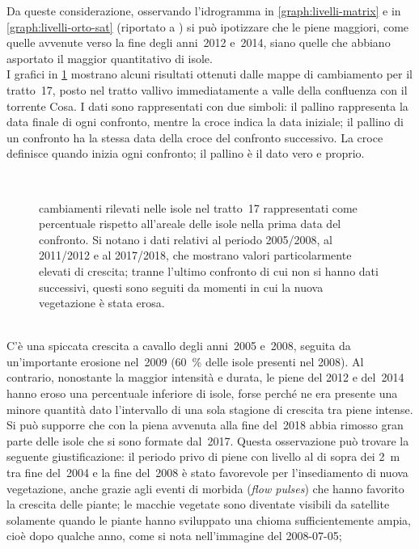 Da queste considerazione, osservando l'idrogramma in \cref{graph:livelli-matrix} e in \cref{graph:livelli-orto-sat} (riportato a ) si può ipotizzare che le piene maggiori, come quelle avvenute verso la fine degli anni~2012 e~2014, siano quelle che abbiano asportato il maggior quantitativo di isole.
\\
I grafici in \cref{graph:tr-17-camb} mostrano alcuni risultati ottenuti dalle mappe di cambiamento per il tratto~17, posto nel tratto vallivo immediatamente a valle della confluenza con il torrente Cosa.
I dati sono rappresentati con due simboli: il pallino rappresenta la data finale di ogni confronto, mentre la croce indica la data iniziale; il pallino di un confronto ha la stessa data della croce del confronto successivo. 
La croce definisce quando inizia ogni confronto; il pallino è il dato vero e proprio.
%
\begin{figure}
	\centering
	
	\\
	
	\caption[cambiamenti esperiti dalle isole nel tratto~17]{cambiamenti rilevati nelle isole nel tratto~17 rappresentati come percentuale rispetto all'areale delle isole nella prima data del confronto. 
	Si notano i dati relativi al periodo 2005/2008, al 2011/2012 e al 2017/2018, che mostrano valori particolarmente elevati di crescita; tranne l'ultimo confronto di cui non si hanno dati successivi, questi sono seguiti da momenti in cui la nuova vegetazione è stata erosa.}
	\label{graph:tr-17-camb}
\end{figure}
%
\\
C'è una spiccata crescita a cavallo degli anni~2005 e~2008, seguita da un'importante erosione nel~2009 (\SI{60}{\percent} delle isole presenti nel 2008).
Al contrario, nonostante la maggior intensità e durata, le piene del 2012 e del~2014 hanno eroso una percentuale inferiore di isole, forse perché ne era presente una minore quantità dato l'intervallo di una sola stagione di crescita tra piene intense.
\\
Si può supporre che con la piena avvenuta alla fine del~2018 abbia rimosso gran parte delle isole che si sono formate dal~2017.
Questa osservazione può trovare la seguente giustificazione: il periodo privo di piene con livello al di sopra dei \SI{2}{\m} tra fine del~2004 e la fine del~2008 è stato favorevole per l'insediamento di nuova vegetazione, anche grazie agli eventi di morbida (\emph{flow pulses}) che hanno favorito la crescita delle piante;
le macchie vegetate sono diventate visibili da satellite solamente quando le piante hanno sviluppato una chioma sufficientemente ampia, cioè dopo qualche anno, come si nota nell'immagine del 2008-07-05;
